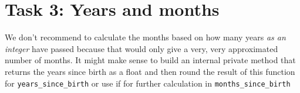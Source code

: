 \pagebreak

\section{Task 3: Years and months}
We don't recommend to calculate the months based on how many years \textit{as
an integer} have passed because that would only give a very, very approximated
number of months. It might make sense to build an internal private method that
returns the years since birth as a float and then round the result of this function
for \texttt{years\_since\_birth} or use if for further calculation in \texttt{months\_since\_birth}



